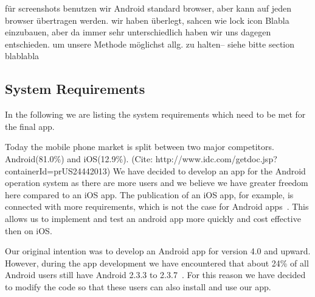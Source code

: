 \begin{description}[leftmargin=0cm]


	\item[Considered Browser] für screenshots benutzen wir Android standard browser, aber kann auf jeden browser übertragen werden.
 wir haben überlegt, sahcen wie lock icon Blabla einzubauen, aber da immer sehr unterschiedlich haben wir uns dagegen entschieden.
 um unsere Methode möglichst allg.
 zu halten-- siehe bitte section blablabla

\end{description}	

\subsection{System Requirements}
In the following we are listing the system requirements which need to be met for the final app.


\begin{description}[leftmargin=0cm]
	\item[Android] Today the mobile phone market is split between two major competitors. Android(81.0\%) and iOS(12.9\%). (Cite: http://www.idc.com/getdoc.jsp?containerId=prUS24442013)
	We have decided to develop an app for the Android operation system as there are more users and we believe we have greater freedom here compared to an iOS app. 
 The publication of an iOS app, for example, is connected with more requirements, which is not the case for Android apps~\cite{publishios, publishandroid}. This allows us to implement and test an android app more quickly and cost effective then on iOS. 
	\item[Version] Our original intention was to develop an Android app for version 4.0 and upward.
 However, during the app development we have encountered that about 24\% of all Android users still have Android 2.3.3 to 2.3.7~\cite{}. For this reason we have decided to modify the code so that these users can also install and use our app.
 
\end{description}

